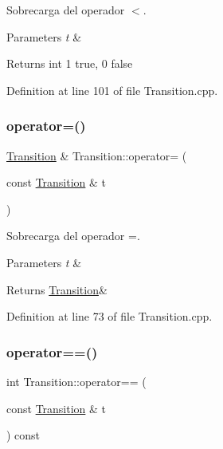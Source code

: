 Sobrecarga del operador $<$. 


\begin{DoxyParams}{Parameters}
{\em t} & \\
\hline
\end{DoxyParams}
\begin{DoxyReturn}{Returns}
int 1 true, 0 false 
\end{DoxyReturn}


Definition at line 101 of file Transition.\+cpp.

\mbox{\label{class_transition_a3bb2d846d692d08eae4f1f8a43fe212d}} 
\subsubsection{\texorpdfstring{operator=()}{operator=()}}
{\footnotesize\ttfamily \hyperlink{class_transition}{Transition} \& Transition\+::operator= (\begin{DoxyParamCaption}\item[{const \hyperlink{class_transition}{Transition} \&}]{t }\end{DoxyParamCaption})}



Sobrecarga del operador =. 


\begin{DoxyParams}{Parameters}
{\em t} & \\
\hline
\end{DoxyParams}
\begin{DoxyReturn}{Returns}
\hyperlink{class_transition}{Transition}\& 
\end{DoxyReturn}


Definition at line 73 of file Transition.\+cpp.

\mbox{\label{class_transition_accb01c1a940c05f24c306c506d8988ff}} 
\subsubsection{\texorpdfstring{operator==()}{operator==()}}
{\footnotesize\ttfamily int Transition\+::operator== (\begin{DoxyParamCaption}\item[{const \hyperlink{class_transition}{Transition} \&}]{t }\end{DoxyParamCaption}) const}




